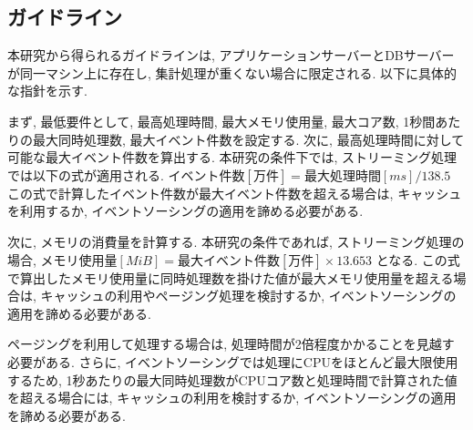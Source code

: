 \documentclass[../../main]{subfiles}
\begin{document}
    \subsection{ガイドライン}\label{subsec:consideration-guideline}

    本研究から得られるガイドラインは, アプリケーションサーバーとDBサーバーが同一マシン上に存在し, 集計処理が重くない場合に限定される. 以下に具体的な指針を示す.

    まず, 最低要件として, 最高処理時間, 最大メモリ使用量, 最大コア数, 1秒間あたりの最大同時処理数, 最大イベント件数を設定する. 次に, 最高処理時間に対して可能な最大イベント件数を算出する. 本研究の条件下では, ストリーミング処理では以下の式が適用される. $ イベント件数[万件] = 最大処理時間[ms] / 138.5 $ この式で計算したイベント件数が最大イベント件数を超える場合は, キャッシュを利用するか, イベントソーシングの適用を諦める必要がある.

    次に, メモリの消費量を計算する. 本研究の条件であれば, ストリーミング処理の場合, $ メモリ使用量[MiB] = 最大イベント件数[万件] \times 13.653 $ となる. この式で算出したメモリ使用量に同時処理数を掛けた値が最大メモリ使用量を超える場合は, キャッシュの利用やページング処理を検討するか, イベントソーシングの適用を諦める必要がある.

    ページングを利用して処理する場合は, 処理時間が2倍程度かかることを見越す必要がある. さらに, イベントソーシングでは処理にCPUをほとんど最大限使用するため, 1秒あたりの最大同時処理数がCPUコア数と処理時間で計算された値を超える場合には, キャッシュの利用を検討するか, イベントソーシングの適用を諦める必要がある.

    \clearpage
\end{document}
